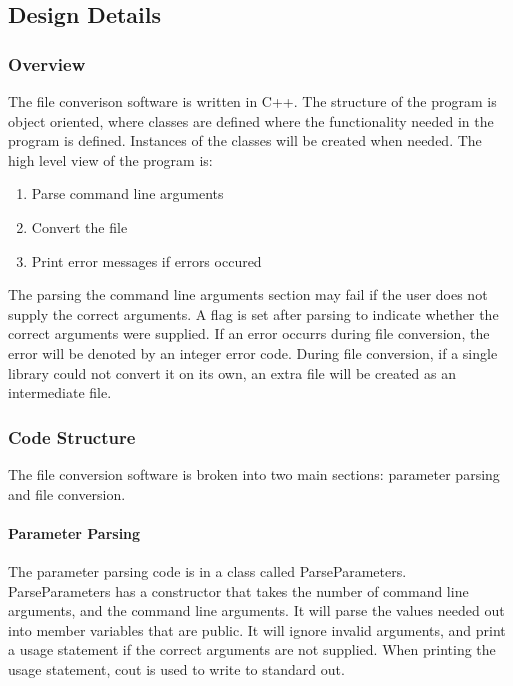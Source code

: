     \subsection{Design Details}

    \subsubsection{Overview}

    The file converison software is written in C++.  The structure of the program is object oriented, where classes are defined where the functionality needed
    in the program is defined.  Instances of the classes will be created when needed.  
    The high level view of the program is:
    \begin{enumerate}
        \item Parse command line arguments
        \item Convert the file
        \item Print error messages if errors occured
    \end{enumerate}

    The parsing the command line arguments section may fail if the user does not supply the correct arguments.  A flag is set after parsing to indicate
    whether the correct arguments were supplied.  If an error occurrs during file conversion, the error will be denoted by an integer error code.  
    During file conversion, if a single library could not convert it on its own, an extra file will be created as an intermediate file.

    \subsubsection{Code Structure}
    The file conversion software is broken into two main sections: parameter parsing and file conversion.

    \paragraph{Parameter Parsing}
    \hfill \break
    The parameter parsing code is in a class called ParseParameters.  ParseParameters has a constructor that takes the number of command line arguments, 
    and the command line arguments.  It will parse the values needed out into member variables that are public.  It will ignore invalid arguments,
    and print a usage statement if the correct arguments are not supplied.  When printing the usage statement, cout is used to write to standard out.

